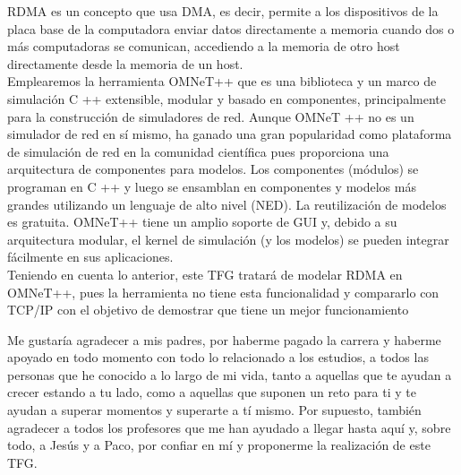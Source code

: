 \cleardoublepage
\thispagestyle{plain}
\begin{center}
\Large{}
\end{center}
\vskip1cm

RDMA es un concepto que usa DMA, es decir, permite a los dispositivos de la placa base de la computadora enviar datos directamente a memoria cuando dos o más computadoras se comunican, accediendo a la memoria de otro host directamente desde la memoria de un host.\\

Emplearemos la herramienta OMNeT++ que es una biblioteca y un marco de simulación C ++ extensible, modular y basado en componentes, principalmente para la construcción de simuladores de red. Aunque OMNeT ++ no es un simulador de red en sí mismo, ha ganado una gran popularidad como plataforma de simulación de red en la comunidad científica pues proporciona una arquitectura de componentes para modelos. Los componentes (módulos) se programan en C ++ y luego se ensamblan en componentes y modelos más grandes utilizando un lenguaje de alto nivel (NED). La reutilización de modelos es gratuita. OMNeT++ tiene un amplio soporte de GUI y, debido a su arquitectura modular, el kernel de simulación (y los modelos) se pueden integrar fácilmente en sus aplicaciones. \cite{Omnet} \\

Teniendo en cuenta lo anterior, este TFG tratará de modelar RDMA en OMNeT++, pues la herramienta no tiene esta funcionalidad y compararlo con TCP/IP con el objetivo de demostrar que tiene un mejor funcionamiento


\cleardoublepage
\thispagestyle{plain}
\begin{center}
\Large{}
\end{center}
\vskip1cm
Me gustaría agradecer a mis padres, por haberme pagado la carrera y haberme apoyado en todo momento con todo lo relacionado a los estudios, a todos las personas que he conocido a lo largo de mi vida, tanto a aquellas que te ayudan a crecer estando a tu lado, como a aquellas que suponen un reto para ti y te ayudan a superar momentos y superarte a tí mismo. Por supuesto, también agradecer a todos los profesores que me han ayudado a llegar hasta aquí y, sobre todo, a Jesús y a Paco, por confiar en mí y proponerme la realización de este TFG.